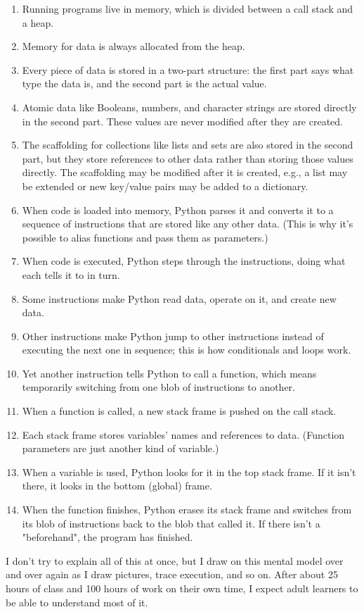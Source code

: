 \begin{enumerate}

\item
  Running programs live in memory, which is divided between a call
  stack and a heap.

\item
  Memory for data is always allocated from the heap.

\item
  Every piece of data is stored in a two-part structure: the first
  part says what type the data is, and the second part is the actual
  value.

\item
  Atomic data like Booleans, numbers, and character strings are stored
  directly in the second part.  These values are never modified after
  they are created.

\item
  The scaffolding for collections like lists and sets are also stored
  in the second part, but they store references to other data rather
  than storing those values directly.  The scaffolding may be modified
  after it is created, e.g., a list may be extended or new key/value
  pairs may be added to a dictionary.

\item
  When code is loaded into memory, Python parses it and converts it to
  a sequence of instructions that are stored like any other data.
  (This is why it's possible to alias functions and pass them as
  parameters.)

\item
  When code is executed, Python steps through the instructions, doing
  what each tells it to in turn.

\item
  Some instructions make Python read data, operate on it, and create
  new data.

\item
  Other instructions make Python jump to other instructions instead of
  executing the next one in sequence; this is how conditionals and
  loops work.

\item
  Yet another instruction tells Python to call a function, which means
  temporarily switching from one blob of instructions to another.

\item
  When a function is called, a new stack frame is pushed on the call
  stack.

\item
  Each stack frame stores variables' names and references to data.
  (Function parameters are just another kind of variable.)

\item
  When a variable is used, Python looks for it in the top stack frame.
  If it isn't there, it looks in the bottom (global) frame.

\item
  When the function finishes, Python erases its stack frame and
  switches from its blob of instructions back to the blob that called
  it.  If there isn't a "beforehand", the program has finished.

\end{enumerate}

I don't try to explain all of this at once, but I draw on this mental
model over and over again as I draw pictures, trace execution, and so
on.  After about 25 hours of class and 100 hours of work on their own
time, I expect adult learners to be able to understand most of it.
